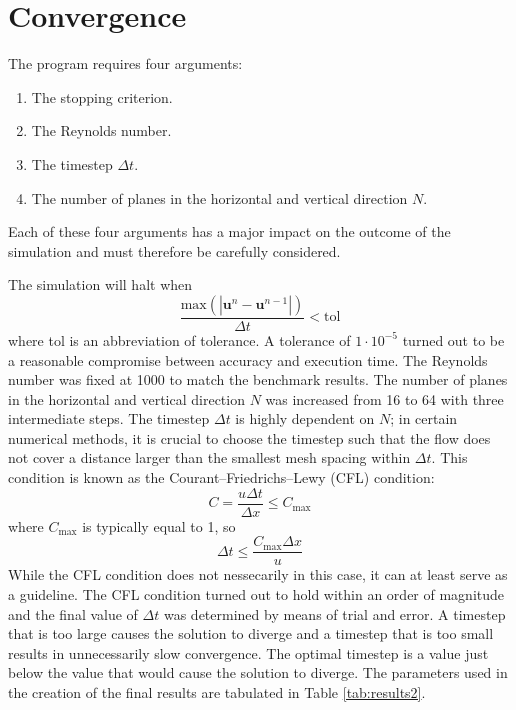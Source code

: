 \section{Convergence}

The program requires four arguments:
\begin{enumerate}
    \item The stopping criterion.
    \item The Reynolds number.
    \item The timestep $\Delta t$.
    \item The number of planes in the horizontal and vertical direction $N$.
\end{enumerate}
Each of these four arguments has a major impact on the outcome of the simulation and must therefore be carefully considered. 

The simulation will halt when
\begin{equation}
    \frac{ \text{max} \left( \left| \mathbf{u}^n - \mathbf{u}^{n-1} \right| \right) }{\Delta t} < \text{tol}
\end{equation}
where tol is an abbreviation of tolerance. A tolerance of $1 \cdot 10^{-5}$ turned out to be a reasonable compromise between accuracy and execution time. The Reynolds number was fixed at 1000 to match the benchmark results. The number of planes in the horizontal and vertical direction $N$ was increased from 16 to 64 with three intermediate steps. The timestep $\Delta t$ is highly dependent on $N$; in certain numerical methods, it is crucial to choose the timestep such that the flow does not cover a distance larger than the smallest mesh spacing within $\Delta t$. This condition is known as the Courant–Friedrichs–Lewy (CFL) condition:
\begin{equation}
    C = \frac{u \Delta t}{\Delta x} \leq C_{\text{max}}
\end{equation}
where $C_{\text{max}}$ is typically equal to 1, so
\begin{equation}
    \Delta t \leq \frac{C_{\text{max}} \Delta x}{u}
\end{equation}
While the CFL condition does not nessecarily in this case, it can at least serve as a guideline. The CFL condition turned out to hold within an order of magnitude and the final value of $\Delta t$ was determined by means of trial and error. A timestep that is too large causes the solution to diverge and a timestep that is too small results in unnecessarily slow convergence. The optimal timestep is a value just below the value that would cause the solution to diverge. The parameters used in the creation of the final results are tabulated in Table \ref{tab:results2}.

